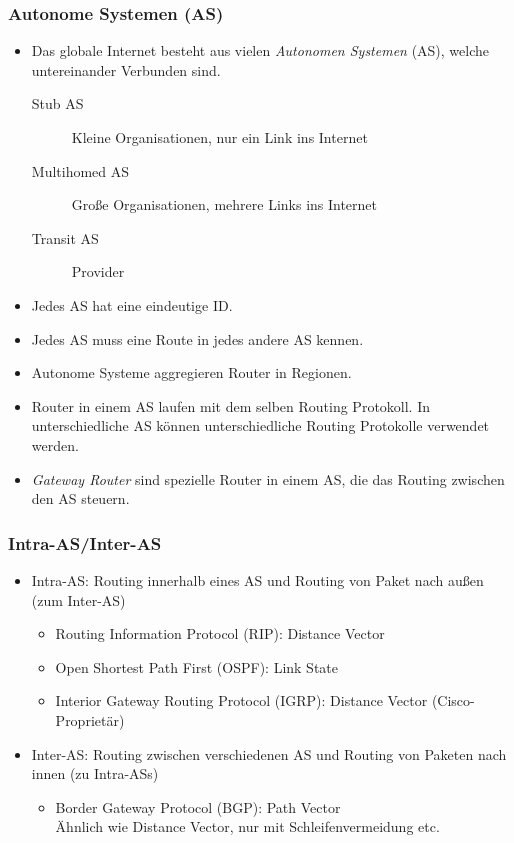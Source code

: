 			\subsubsection{Autonome Systemen (AS)}
				\begin{itemize}
					\item Das globale Internet besteht aus vielen \textit{Autonomen Systemen} (AS), welche untereinander Verbunden sind.
						\begin{description}
							\item[Stub AS] Kleine Organisationen, nur ein Link ins Internet
							\item[Multihomed AS] Große Organisationen, mehrere Links ins Internet
							\item[Transit AS] Provider
						\end{description}
					\item Jedes AS hat eine eindeutige ID.
					\item Jedes AS muss eine Route in jedes andere AS kennen.
					\item Autonome Systeme aggregieren Router in Regionen.
					\item Router in einem AS laufen mit dem selben Routing Protokoll. In unterschiedliche AS können unterschiedliche Routing Protokolle verwendet werden.
					\item \textit{Gateway Router} sind spezielle Router in einem AS, die das Routing zwischen den AS steuern.
				\end{itemize}

			\subsubsection{Intra-AS/Inter-AS}
				\begin{itemize}
					\item Intra-AS: Routing innerhalb eines AS und Routing von Paket nach außen (zum Inter-AS)
						\begin{itemize}
							\item Routing Information Protocol (RIP): Distance Vector
							\item Open Shortest Path First (OSPF): Link State
							\item Interior Gateway Routing Protocol (IGRP): Distance Vector (Cisco-Proprietär)
						\end{itemize}
					\item Inter-AS: Routing zwischen verschiedenen AS und Routing von Paketen nach innen (zu Intra-ASs)
						\begin{itemize}
							\item Border Gateway Protocol (BGP): Path Vector \\ Ähnlich wie Distance Vector, nur mit Schleifenvermeidung etc.
						\end{itemize}
				\end{itemize}

